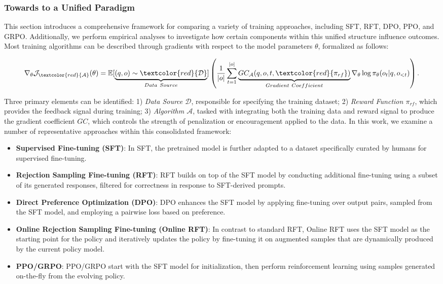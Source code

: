\begin{itemize}[topsep=0pt]
\begin{itemize}[topsep=0pt]
\subsubsection{Towards to a Unified Paradigm} This section introduces a comprehensive framework for comparing a variety of training approaches, including SFT, RFT, DPO, PPO, and GRPO. Additionally, we perform empirical analyses to investigate how certain components within this unified structure influence outcomes. Most training algorithms can be described through gradients with respect to the model parameters $\theta$, formalized as follows:

\begin{equation}
    \nabla_{\theta}\mathcal{J}_{\textcolor{red}{\mathcal{A}}}(\theta) = \mathbb{E}[\underbrace{(q,o) \sim \textcolor{red}{\mathcal{D}}}_{Data \ Source}]\left( \frac{1}{|o|} \sum_{t=1}^{|o|}  \underbrace{GC_{{\mathcal{A}}}(q, o, t, \textcolor{red}{\pi_{{rf}}})}_{Gradient \ Coefficient}  \nabla_{\theta}\log \pi_{\theta}(o_t | q, o_{<t})\right).
\label{eq:objective}
\end{equation}

Three primary elements can be identified: 1) \textit{Data Source $\mathcal{D}$}, responsible for specifying the training dataset; 2) \textit{Reward Function $\pi_{{rf}}$}, which provides the feedback signal during training; 3) \textit{Algorithm $\mathcal{A}$}, tasked with integrating both the training data and reward signal to produce the gradient coefficient $GC$, which controls the strength of penalization or encouragement applied to the data. In this work, we examine a number of representative approaches within this consolidated framework:

\begin{itemize}
    \item  \textbf{Supervised Fine-tuning (SFT)}: In SFT, the pretrained model is further adapted to a dataset specifically curated by humans for supervised fine-tuning.
    \item \textbf{Rejection Sampling Fine-tuning (RFT)}: RFT builds on top of the SFT model by conducting additional fine-tuning using a subset of its generated responses, filtered for correctness in response to SFT-derived prompts.
    \item \textbf{Direct Preference Optimization (DPO)}: DPO enhances the SFT model by applying fine-tuning over output pairs, sampled from the SFT model, and employing a pairwise loss based on preference.
    \item \textbf{Online Rejection Sampling Fine-tuning (Online RFT)}: In contrast to standard RFT, Online RFT uses the SFT model as the starting point for the policy and iteratively updates the policy by fine-tuning it on augmented samples that are dynamically produced by the current policy model.
    \item \textbf{PPO/GRPO}: PPO/GRPO start with the SFT model for initialization, then perform reinforcement learning using samples generated on-the-fly from the evolving policy.
\end{itemize}


\end{itemize}
\end{itemize}
